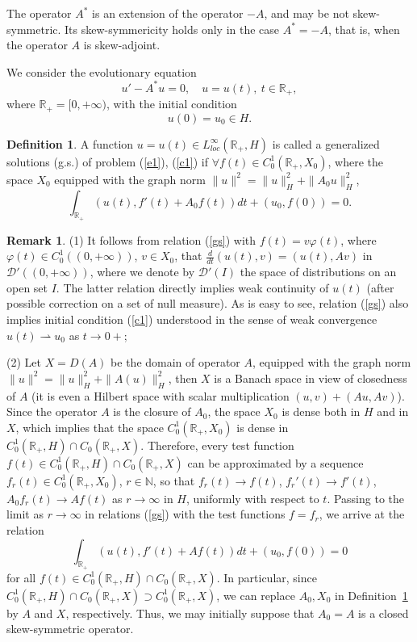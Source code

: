 \documentclass[12pt]{article}
\newcommand{\R}{{\mathbb R}}
\newcommand{\N}{{\mathbb N}}
\newcommand{\D}{{\mathcal D}}
\numberwithin{equation}{section}
\theoremstyle{plain}
\theoremstyle{definition}
\newtheorem{definition}{Definition}[section]
\newtheorem{remark}{Remark}[section]
\begin{document}
The operator $A^*$ is an extension of the operator $-A$, and may be not skew-symmetric. Its skew-symmericity holds only in the case $A^*=-A$, that is, when the operator $A$ is skew-adjoint.

We consider the evolutionary equation
\begin{equation}\label{e1}
u'-A^*u =0, \quad u=u(t), \ t\in\R_+,
\end{equation}
where $\R_+=[0,+\infty)$, with the initial condition
\begin{equation}\label{c1}
u(0)=u_0\in H.
\end{equation}

\begin{definition}\label{def1}
A function $u=u(t)\in L^\infty_{loc}(\R_+,H)$ is called a generalized solutions (g.s.) of problem (\ref{e1}), (\ref{c1}) if
$\forall f(t)\in C_0^1(\R_+,X_0)$, where the space $X_0$ equipped with the graph norm $\|u\|^2=\|u\|_H^2+\|A_0u\|_H^2$,
\begin{equation}\label{gs}
\int_{\R_+}(u(t),f'(t)+A_0f(t))dt+(u_0,f(0))=0.
\end{equation}
\end{definition}

\begin{remark}\label{rem1}
(1) It follows from relation (\ref{gs}) with $f(t)=v\varphi(t)$, where $\varphi(t)\in C_0^1((0,+\infty))$, $v\in X_0$, that
$\frac{d}{dt} (u(t),v)=(u(t),Av)$ in $\D'((0,+\infty))$, where we denote by $\D'(I)$ the space of distributions on an open set $I$. The latter relation directly implies weak continuity of $u(t)$ (after possible correction on a set of null measure). As is easy to see, relation (\ref{gs}) also implies initial condition
(\ref{c1}) understood in the sense of weak convergence $u(t)\rightharpoonup u_0$ as $t\to 0+$;

(2) Let $X=D(A)$ be the domain of operator $A$, equipped with the graph norm $\|u\|^2=\|u\|_H^2+\|A(u)\|_H^2$, then $X$ is a Banach space in view of closedness of $A$ (it is even a Hilbert space with scalar multiplication $(u,v)+(Au,Av)$). Since the operator $A$ is the closure of $A_0$, the space $X_0$ is dense both in $H$ and in $X$, which implies that the space $C_0^1(\R_+,X_0)$ is dense in $C_0^1(\R_+,H)\cap C_0(\R_+,X)$. Therefore, every test function $f(t)\in C_0^1(\R_+,H)\cap C_0(\R_+,X)$ can be approximated by a sequence
$f_r(t)\in C_0^1(\R_+,X_0)$, $r\in\N$, so that $f_r(t)\to f(t)$, $f_r'(t)\to f'(t)$, $A_0f_r(t)\to Af(t)$ as $r\to\infty$ in $H$, uniformly with respect to $t$. Passing to the limit as $r\to\infty$ in relations (\ref{gs}) with the test functions $f=f_r$, we arrive at the relation
\[
\int_{\R_+}(u(t),f'(t)+Af(t))dt+(u_0,f(0))=0
\]
for all $f(t)\in C_0^1(\R_+,H)\cap C_0(\R_+,X)$. In particular, since $C_0^1(\R_+,H)\cap C_0(\R_+,X)\supset C_0^1(\R_+,X)$, we can replace $A_0,X_0$ in Definition~\ref{def1} by  $A$ and $X$, respectively. Thus, we may initially suppose that $A_0=A$ is a closed skew-symmetric operator.
\end{remark}
\end{document}
